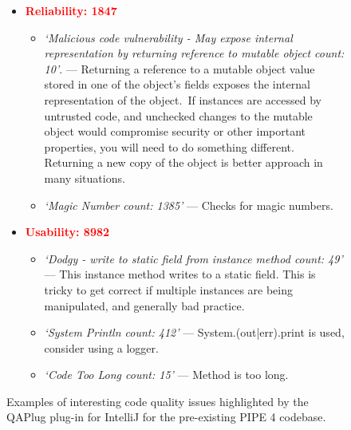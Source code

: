 \begin{figure}[tbp]
\begin{framed}
\begin{itemize}
    \item \textcolor{red}{\textbf{Reliability: 1847}}
    \begin{itemize}
        \item \textit{`Malicious code vulnerability - May expose internal representation by returning reference to mutable object count: 10'}. --- Returning a reference to a mutable object value stored in one of the object's fields exposes the internal representation of the object. If instances are accessed by untrusted code, and unchecked changes to the mutable object would compromise security or other important properties, you will need to do something different. Returning a new copy of the object is better approach in many situations.
        \item \textit{`Magic Number count: 1385'} --- Checks for magic numbers.
    \end{itemize}

    \item \textcolor{red}{\textbf{Usability: 8982}}
    \begin{itemize}
        \item \textit{`Dodgy - write to static field from instance method count: 49'} --- This instance method writes to a static field. This is tricky to get correct if multiple instances are being manipulated, and generally bad practice. 
        \item \textit{`System Println count: 412'} --- System.(out|err).print is used, consider using a logger.
        \item \textit{`Code Too Long count: 15'} --- Method is too long.

    \end{itemize}
\end{itemize} 
\end{framed}
\caption{Examples of interesting code quality issues highlighted by the QAPlug plug-in for IntelliJ for the pre-existing PIPE 4 codebase.}
\label{fig:qaplug}
\end{figure}
\normallinespacing